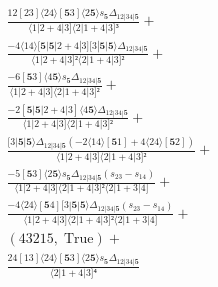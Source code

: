 \documentclass[varwidth, border=5pt]{standalone}
\begin{document}
\begin{my}
$\begin{gathered}
\scriptscriptstyle\frac{12[23]⟨24⟩[𝟓3]⟨2𝟓⟩s_{𝟓}Δ_{12|34|𝟓}}{⟨1|2+4|3]⟨2|1+4|3]³} +\\
\scriptscriptstyle\frac{-4⟨14⟩[𝟓|𝟓|2+4|3][3|𝟓|𝟓⟩Δ_{12|34|𝟓}}{⟨1|2+4|3]²⟨2|1+4|3]²} +\\
\scriptscriptstyle\frac{-6[𝟓3]⟨4𝟓⟩s_{𝟓}Δ_{12|34|𝟓}}{⟨1|2+4|3]⟨2|1+4|3]²} +\\
\scriptscriptstyle\frac{-2[𝟓|𝟓|2+4|3]⟨4𝟓⟩Δ_{12|34|𝟓}}{⟨1|2+4|3]⟨2|1+4|3]²} +\\
\scriptscriptstyle\frac{[3|𝟓|𝟓⟩Δ_{12|34|𝟓}(-2⟨14⟩[𝟓1]+4⟨24⟩[𝟓2])}{⟨1|2+4|3]⟨2|1+4|3]²} +\\
\scriptscriptstyle\frac{-5[𝟓3]⟨2𝟓⟩s_{𝟓}Δ_{12|34|𝟓}(s_{23}-s_{14})}{⟨1|2+4|3]⟨2|1+4|3]²⟨2|1+3|4]} +\\
\scriptscriptstyle\frac{-4⟨24⟩[𝟓4][3|𝟓|𝟓⟩Δ_{12|34|𝟓}(s_{23}-s_{14})}{⟨1|2+4|3]⟨2|1+4|3]²⟨2|1+3|4]} +\\
\scriptscriptstyle(43215,\;\text{True}) +\\
\scriptscriptstyle\frac{24[13]⟨24⟩[𝟓3]⟨2𝟓⟩s_{𝟓}Δ_{12|34|𝟓}}{⟨2|1+4|3]⁴} \phantom{+}
\end{gathered}$
\end{my}
\end{document}
